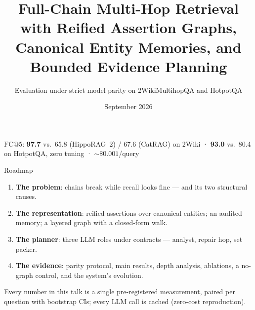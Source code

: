 \documentclass[aspectratio=169,10pt]{beamer}
\title{Full-Chain Multi-Hop Retrieval with Reified Assertion Graphs,\\
Canonical Entity Memories, and Bounded Evidence Planning}
\subtitle{Evaluation under strict model parity on 2WikiMultihopQA and HotpotQA}
\author{}
\date{September 2026}
\newcommand{\hippo}{HippoRAG~2}
\begin{document}
\begin{frame}
\titlepage
\vspace{-6mm}
\centering\scriptsize
$\mathrm{FC@}5$: \textbf{97.7} vs.\ 65.8 (\hippo{}) / 67.6 (CatRAG) on 2Wiki
\;·\; \textbf{93.0} vs.\ 80.4 on HotpotQA, zero tuning \;·\; ${\sim}\$0.001$/query
\end{frame}

\begin{frame}{Roadmap}
\begin{enumerate}
\item \textbf{The problem}: chains break while recall looks fine --- and its two structural causes.
\item \textbf{The representation}: reified assertions over canonical entities; an audited memory; a layered graph with a closed-form walk.
\item \textbf{The planner}: three LLM roles under contracts --- analyst, repair hop, set packer.
\item \textbf{The evidence}: parity protocol, main results, depth analysis, ablations, a no-graph control, and the system's evolution.
\end{enumerate}
\vfill
\scriptsize Every number in this talk is a single pre-registered measurement,
paired per question with bootstrap CIs; every LLM call is cached (zero-cost
reproduction).
\end{frame}
\end{document}
